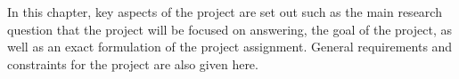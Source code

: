 In this chapter, key aspects of the project are set out such as the main research question that the project will be focused on answering, the goal of the project, as well as an exact formulation of the project assignment. General requirements and constraints for the project are also given here.

